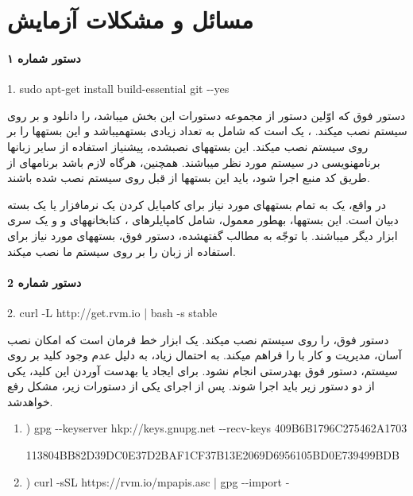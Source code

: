 \chapter{مسائل و مشکلات آزمایش }
\label{LiveTestA}
\subsubsection{دستور شماره ۱}
\begin{latin}
1. sudo apt-get install build-essential git  -\nf -yes
\end{latin}
دستور فوق که اوّلین دستور از مجموعه دستورات این بخش می\nf باشد،  را دانلود و بر روی سیستم نصب می\nf کند. ، یک  است که شامل  به تعداد زیادی بستهمی\nf باشد و این بسته\nf ها را بر روی سیستم نصب می\nf کند. این بسته\nf های نصب\nf شده، پیش\nf نیاز استفاده از سایر زبان\nf ها برنامه\nf نویسی در سیستم مورد نظر می\nf باشند. همچنین، هرگاه لازم باشد برنامه\nf ای از طریق کد منبع اجرا شود، باید این بسته\nf ها از قبل روی سیستم نصب شده باشند. 

در واقع،  یک  به تمام بسته\nf های مورد نیاز برای کامپایل کردن یک نرم\nf افزار یا یک بسته دبیان است. این بسته\nf ها، به\nf طور معمول، شامل کامپایلرهای ، کتابخانه\nf های  و  و یک سری ابزار دیگر می\nf باشند. با توجّه به مطالب گفته\nf شده، دستور فوق، بسته\nf های مورد نیاز برای استفاده از زبان  را بر روی سیستم ما نصب می\nf کند.



\subsubsection{دستور شماره 2}
\begin{latin}
\setlength{\parindent}{0ex}
2. curl -L http://get.rvm.io | bash -s stable
\end{latin}

دستور فوق،  را روی سیستم نصب می\nf کند.  یک ابزار خط فرمان است که امکان نصب آسان، مدیریت و کار با  را فراهم می\nf کند. به احتمال زیاد، به دلیل عدم وجود کلید 
 بر روی سیستم، دستور فوق به\nf درستی انجام نشود. برای ایجاد یا به\nf دست آوردن این کلید، یکی از دو دستور زیر باید اجرا شوند. پس از اجرای یکی از دستورات زیر، مشکل رفع خواهدشد.
\begin{latin}
\setlength{\parindent}{0ex}
\renewcommand{\labelenumi}{\Roman{enumi}}
\begin{enumerate}
\item) gpg -\nf -keyserver hkp://keys.gnupg.net -\nf -recv-keys 409B6B1796C275462A1703

113804BB82D39DC0E37D2BAF1CF37B13E2069D6956105BD0E739499BDB 
\item) curl -sSL https://rvm.io/mpapis.asc | gpg -\nf -import -
\end{enumerate}
\end{latin}

